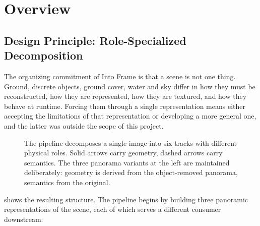 \section{Overview}
\label{sec:overview}

\subsection{Design Principle: Role-Specialized Decomposition}

The organizing commitment of Into Frame is that a scene is not one thing. Ground,
discrete objects, ground cover, water and sky differ in how they must be
reconstructed, how they are represented, how they are textured, and how they
behave at runtime. Forcing them through a single representation means either
accepting the limitations of that representation or developing a more general one,
and the latter was outside the scope of this project.

\begin{figure}[htbp]
  \centering
  \makebox[\linewidth][c]{\resizebox{19cm}{!}{}}
  \caption{The pipeline decomposes a single image into six tracks with different
  physical roles. Solid arrows carry geometry, dashed arrows carry semantics.
  The three panorama variants at the left are maintained deliberately: geometry is
  derived from the object-removed panorama, semantics from the original.}
  \label{fig:pipeline}
\end{figure}

 shows the resulting structure. The pipeline begins by building
three panoramic representations of the scene, each of which serves a different
consumer downstream:


